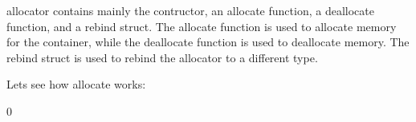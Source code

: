 {\ttfamily allocator} contains mainly the contructor, an {\ttfamily allocate} function, a {\ttfamily deallocate} function, and a {\ttfamily rebind} struct. The {\ttfamily allocate} function is used to allocate memory for the container, while the {\ttfamily deallocate} function is used to deallocate memory. The {\ttfamily rebind} struct is used to rebind the allocator to a different type.

Let\textquotesingle{}s see how {\ttfamily allocate} works\+:


\begin{DoxyCode}{0}
\DoxyCodeLine{\ \ \ \ \}}
\DoxyCodeLine{\ \ \ \ \ \ \ \ \textcolor{keywordflow}{return}\ \textcolor{keyword}{nullptr};}
\DoxyCodeLine{\ \ \ \ \}}
\DoxyCodeLine{\}}

\end{DoxyCode}
 